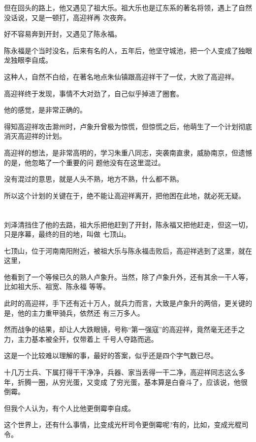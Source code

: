 \documentclass[11pt,a4paper,onecolumn]{article}
\begin{document}
但在回头的路上，他又遇见了祖大乐。祖大乐也是辽东系的著名将领，遇上了自然没话说，又是一顿打，高迎祥再
次夜奔。

好不容易奔到开封，又遇见了陈永福。

陈永福是个当时没名，后来有名的人，五年后，他坚守城池，把一个人变成了独眼龙\myrule 独眼李自成。

这种人，自然不白给，在著名地点朱仙镇跟高迎祥干了一仗，大败了高迎祥。

高迎祥终于发现，事情不大对劲了，自己似乎掉进了圈套。

他的感觉，是非常正确的。

得知高迎祥攻击滁州时，卢象升曾极为惊慌，但惊慌之后，他萌生了一个计划\myrule 彻底消灭高迎祥的计划。

高迎祥的想法，是非常高明的，学习朱重八同志，突袭南直隶，威胁南京，但遗憾的是，他忽略了一个重要的问
题\myrule 他没有在这里混过。

没有混过的意思，就是人头不熟，地方不熟，什么都不熟。

所以这个计划的关键在于，绝不能让高迎祥离开，把他困在此地，就必死无疑。

\section[\thesection]{}

刘泽清挡住了他的去路，祖大乐把他赶到了开封，陈永福又把他赶走，但这一切，只是序幕，最终的目的地，叫做
七顶山。

七顶山，位于河南南阳附近，被祖大乐与陈永福击败后，高迎祥逃到了这里，就在这里，

他看到了一个等候已久的熟人\myrule 卢象升。当然，除了卢象升外，还有其余一干人等，比如祖大乐、祖宽、陈永福
等等。

此时的高迎祥，手下还有近十万人，就兵力而言，大致是卢象升的两倍，更关键的是，他的主力重甲骑兵，依然还
有三万多人。

然而战争的结果，却让人大跌眼镜，号称``第一强寇''的高迎祥，竟然毫无还手之力，主力基本被全歼，仅带着上
千号人夺路而逃。

这是一个比较难以理解的事，最好的答案，似乎还是四个字\myrule 气数已尽。

十几万士兵、下属打得干干净净，兵器、家当丢得一干二净，高迎祥同志这么多年，折腾一圈，从穷光蛋，又变成
了穷光蛋，基本算是白奋斗了，应该说，他很倒霉。

但我个人认为，有个人比他更倒霉\myrule 李自成。

这个世界上，还有什么事情，比变成光杆司令更倒霉呢?有的，比如，变成光棍司令。
\end{document}

